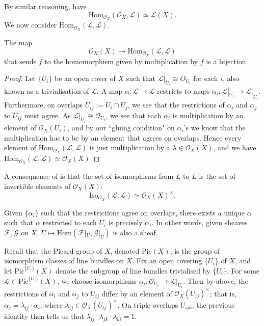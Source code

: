 By similar reasoning, have
\[ \mathrm{Hom}_{\mathcal{O}_X}(\mathcal{O}_X, \mathcal{L}) \simeq \mathcal{L}(X).\]
We now consider $\mathrm{Hom}_{\mathcal{O}_X}(\mathcal{L}, \mathcal{L})$.
\begin{proposition}\label{prop:homll}
  The map
  \[ \mathcal{O}_X(X) \to \mathrm{Hom}_{\mathcal{O}_X}(\mathcal{L}, \mathcal{L})\]
  that sends \(f\) to the homomorphism given by multiplication by \(f\) is a bijection.
\end{proposition}
\begin{proof}
  Let $\{U_i\}$ be an open cover of $X$ such that $\mathcal{L}|_{U_i} \cong O_{U_i}$ for each $i$, also known as a trivialisation of $\mathcal{L}$. A map $\alpha: \mathcal{L} \to \mathcal{L}$ restricts to maps $\alpha_i: \mathcal{L}|_{U_i} \to \mathcal{L}|_{U_i}$. Furthermore, on overlaps $U_{ij} := U_i \cap U_j$, we see that the restrictions of $\alpha_i$ and $\alpha_j$ to $U_{ij}$ must agree. As $\mathcal{L}|_{U_i} \cong \mathcal{O}_{U_i}$, we see that each $\alpha_i$ is multiplication by an element of $\mathcal{O}_X(U_i)$, and by our ``gluing condition" on $\alpha_i$'s we know that the multiplication has to be by an element that agrees on overlaps. Hence every element of $\mathrm{Hom}_{\mathcal{O}_X}(\mathcal{L}, \mathcal{L})$ is just multiplication by a $\lambda \in \mathcal{O}_X(X)$, and we have $\mathrm{Hom}_{\mathcal{O}_X}(\mathcal{L}, \mathcal{L}) \simeq \mathcal{O}_X(X)$
\end{proof}
A consequence of  is that the set of isomorphisms from \(L\) to \(L\) is the set of invertible elements of \(\mathcal{O}_X(X)\):
\[ \mathrm{Iso}_{\mathcal{O}_X}(\mathcal{L}, \mathcal{L}) \simeq \mathcal{O}_X(X)^\times.\]


\begin{remark}
    Given $\{\alpha_i\}$ such that the restrictions agree on overlaps, there exists a unique $\alpha$ such that $\alpha$ restricted to each $U_i$ is precisely $\alpha_i$. In other words, given sheaves $\mathcal{F}, \mathcal{G}$ on $X$, $U \mapsto \mathrm{Hom}(\mathcal{F}|_U, \mathcal{G}|_U)$ is also a sheaf. 
\end{remark}

Recall that the Picard group of $X$, denoted $\mathrm{Pic}(X)$, is the group of isomorphism classes of line bundles on $X$. Fix an open covering $\{U_i\}$ of $X$, and let $\mathrm{Pic}^{\{U_i\}}(X)$ denote the subgroup of line bundles trivialised by $\{U_i\}$. For some $\mathcal{L} \in \mathrm{Pic}^{\{U_i\}}(X)$, we choose isomorphisms $\alpha_i: \mathcal{O}_{U_i} \to \mathcal{L}|_{U_i}$. Then by above, the restrictions of $\alpha_i$ and $\alpha_j$ to $U_{ij}$ differ by an element of $\mathcal{O}_X(U_{ij})^\times$; that is, $\alpha_j = \lambda_{ij} \cdot \alpha_i$, where $\lambda_{ij} \in \mathcal{O}_X(U_{ij})^\times$. On triple overlaps $U_{ijk}$, the previous identity then tells us that $\lambda_{ij} \cdot \lambda_{jk} \cdot \lambda_{ki} = 1$. 

